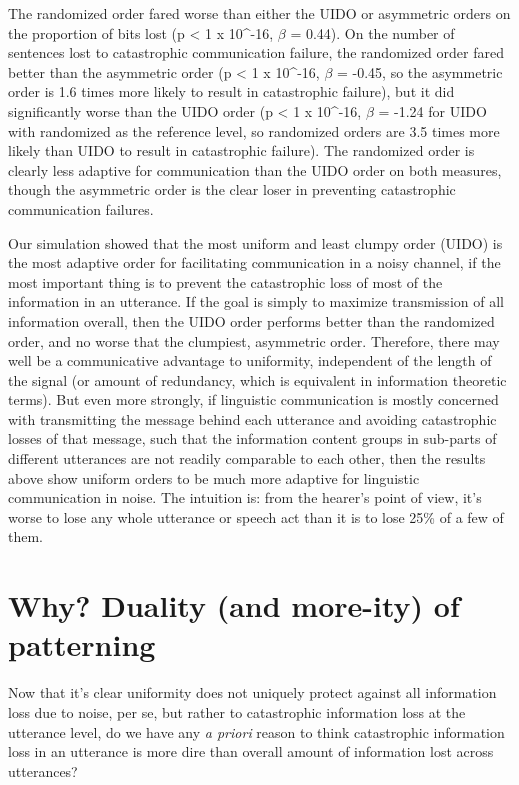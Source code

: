 \documentclass[12pt]{article}
\begin{document}
The randomized order fared worse than either the UIDO or asymmetric orders on the proportion of bits lost (p < 1 x 10^{-16}, $\beta$ = 0.44). On the number of sentences lost to catastrophic communication failure, the randomized order fared better than the asymmetric order (p < 1 x 10^{-16}, $\beta$ = -0.45, so the asymmetric order is 1.6 times more likely to result in catastrophic failure), but it did significantly worse than the UIDO order (p < 1 x 10^{-16}, $\beta$ = -1.24 for UIDO with randomized as the reference level, so randomized orders are 3.5 times more likely than UIDO to result in catastrophic failure). The randomized order is clearly less adaptive for communication than the UIDO order on both measures, though the asymmetric order is the clear loser in preventing catastrophic communication failures.

Our simulation showed that the most uniform and least clumpy order (UIDO) is the most adaptive order for facilitating communication in a noisy channel, if the most important thing is to prevent the catastrophic loss of most of the information in an utterance. If the goal is simply to maximize transmission of all information overall, then the UIDO order performs better than the randomized order, and no worse that the clumpiest, asymmetric order. Therefore, there may well be a communicative advantage to uniformity, independent of the length of the signal (or amount of redundancy, which is equivalent in information theoretic terms). But even more strongly, if linguistic communication is mostly concerned with transmitting the message behind each utterance and avoiding catastrophic losses of that message, such that the information content groups in sub-parts of different utterances are not readily comparable to each other, then the results above show uniform orders to be much more adaptive for linguistic communication in noise. The intuition is: from the hearer's point of view, it's worse to lose any whole utterance or speech act than it is to lose 25\% of a few of them.


\section{Why? Duality (and more-ity) of patterning}
\label{moreity}

Now that it's clear uniformity does not uniquely protect against all information loss due to noise, per se, but rather to catastrophic information loss at the utterance level, do we have any \textsl{a priori} reason to think catastrophic information loss in an utterance is more dire than overall amount of information lost across utterances? 
\end{document}
